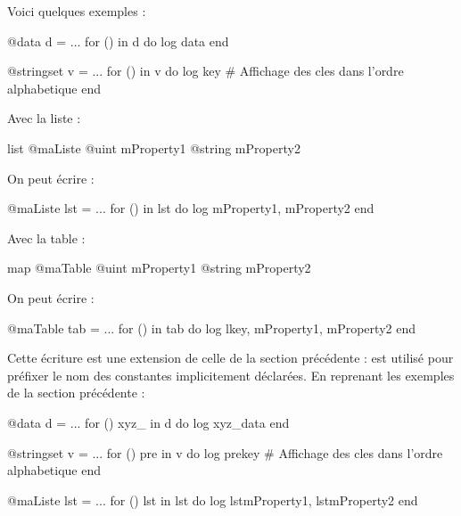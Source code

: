 {Voici quelques exemples :
\begin{galgascode}
@data d = ...
for () in d do
  log data
end
\end{galgascode}



\begin{galgascode}
@stringset v = ...
for () in v do
  log key # Affichage des cles dans l'ordre alphabetique
end
\end{galgascode}

Avec la liste :
\begin{galgascode}
list @maListe {
  @uint mProperty1
  @string mProperty2
}
\end{galgascode}

On peut écrire :

\begin{galgascode}
@maListe lst = ...
for () in lst do
  log mProperty1, mProperty2
end
\end{galgascode}


Avec la table :
\begin{galgascode}
map @maTable {
  @uint mProperty1
  @string mProperty2
}
\end{galgascode}

On peut écrire :

\begin{galgascode}
@maTable tab = ...
for () in tab do
  log lkey, mProperty1, mProperty2
end
\end{galgascode}



Cette écriture est une extension de celle de la section précédente :  est utilisé pour préfixer le nom des constantes implicitement déclarées. En reprenant les exemples de la section précédente :

\begin{galgascode}
@data d = ...
for () xyz_ in d do
  log xyz_data
end
\end{galgascode}



\begin{galgascode}
@stringset v = ...
for () pre in v do
  log prekey # Affichage des cles dans l'ordre alphabetique
end
\end{galgascode}


\begin{galgascode}
@maListe lst = ...
for () lst in lst do
  log lstmProperty1, lstmProperty2
end
\end{galgascode}


}
